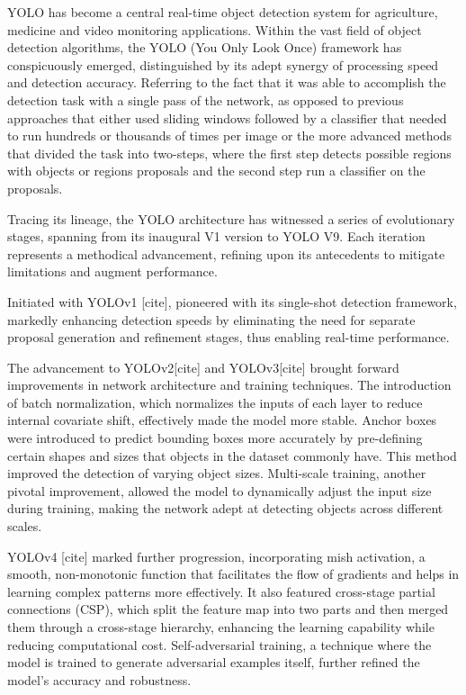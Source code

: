 YOLO has become a central real-time object detection system for agriculture, medicine and video monitoring applications. Within the vast field of object detection algorithms, the YOLO (You Only Look Once) framework has conspicuously emerged, distinguished by its adept synergy of processing speed and detection accuracy. Referring to the fact that it was able to accomplish the detection task with a single pass of the network, as opposed to previous approaches that either used sliding windows followed by a classifier that needed to run hundreds or thousands of times per image or the more advanced methods that divided the task into two-steps, where the first step detects possible regions with objects or regions proposals and the second step run a classifier on the proposals.

Tracing its lineage, the YOLO architecture has witnessed a series of evolutionary stages, spanning from its inaugural V1 version to YOLO V9. Each iteration represents a methodical advancement, refining upon its antecedents to mitigate limitations and augment performance. 

Initiated with YOLOv1 [cite], pioneered with its single-shot detection framework, markedly enhancing detection speeds by eliminating the need for separate proposal generation and refinement stages, thus enabling real-time performance. 

The advancement to YOLOv2[cite] and YOLOv3[cite] brought forward improvements in network architecture and training techniques. The introduction of batch normalization, which normalizes the inputs of each layer to reduce internal covariate shift, effectively made the model more stable. Anchor boxes were introduced to predict bounding boxes more accurately by pre-defining certain shapes and sizes that objects in the dataset commonly have. This method improved the detection of varying object sizes. Multi-scale training, another pivotal improvement, allowed the model to dynamically adjust the input size during training, making the network adept at detecting objects across different scales.

YOLOv4 [cite] marked further progression, incorporating mish activation, a smooth, non-monotonic function that facilitates the flow of gradients and helps in learning complex patterns more effectively. It also featured cross-stage partial connections (CSP), which split the feature map into two parts and then merged them through a cross-stage hierarchy, enhancing the learning capability while reducing computational cost. Self-adversarial training, a technique where the model is trained to generate adversarial examples itself, further refined the model's accuracy and robustness.

